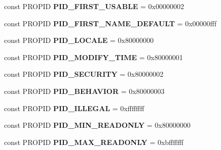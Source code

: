 \begin{DoxyCompactItemize}
\item 
\mbox{\label{interface_i_property_storage_ad9828c2a5d02ef7942d588a1b20899f5}} 
const P\+R\+O\+P\+ID {\bfseries P\+I\+D\+\_\+\+F\+I\+R\+S\+T\+\_\+\+U\+S\+A\+B\+LE} = 0x00000002
\item 
\mbox{\label{interface_i_property_storage_a6e34f414f534300321c6e17dd79bbd5d}} 
const P\+R\+O\+P\+ID {\bfseries P\+I\+D\+\_\+\+F\+I\+R\+S\+T\+\_\+\+N\+A\+M\+E\+\_\+\+D\+E\+F\+A\+U\+LT} = 0x00000fff
\item 
\mbox{\label{interface_i_property_storage_ad697e5e2437196f766dbd2379e45f5cc}} 
const P\+R\+O\+P\+ID {\bfseries P\+I\+D\+\_\+\+L\+O\+C\+A\+LE} = 0x80000000
\item 
\mbox{\label{interface_i_property_storage_a69d4758c1f9f7cd21f6ac07788611b7f}} 
const P\+R\+O\+P\+ID {\bfseries P\+I\+D\+\_\+\+M\+O\+D\+I\+F\+Y\+\_\+\+T\+I\+ME} = 0x80000001
\item 
\mbox{\label{interface_i_property_storage_aa0283a56aa33bdb4f72f0d26d9324dcd}} 
const P\+R\+O\+P\+ID {\bfseries P\+I\+D\+\_\+\+S\+E\+C\+U\+R\+I\+TY} = 0x80000002
\item 
\mbox{\label{interface_i_property_storage_ab2dbbaa11d9f27dbeb487a79175db6ad}} 
const P\+R\+O\+P\+ID {\bfseries P\+I\+D\+\_\+\+B\+E\+H\+A\+V\+I\+OR} = 0x80000003
\item 
\mbox{\label{interface_i_property_storage_a4fd7791a0f749010c53f9c705957e051}} 
const P\+R\+O\+P\+ID {\bfseries P\+I\+D\+\_\+\+I\+L\+L\+E\+G\+AL} = 0xffffffff
\item 
\mbox{\label{interface_i_property_storage_acc2a7c13146d63bbd06b34fa60007faa}} 
const P\+R\+O\+P\+ID {\bfseries P\+I\+D\+\_\+\+M\+I\+N\+\_\+\+R\+E\+A\+D\+O\+N\+LY} = 0x80000000
\item 
\mbox{\label{interface_i_property_storage_a80279eefbd1035232b955cbcf2906705}} 
const P\+R\+O\+P\+ID {\bfseries P\+I\+D\+\_\+\+M\+A\+X\+\_\+\+R\+E\+A\+D\+O\+N\+LY} = 0xbfffffff

\end{DoxyCompactItemize}
